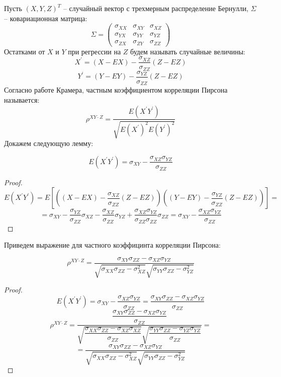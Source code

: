 Пусть $(X,Y,Z)^T$ -- случайный вектор с трехмерным распределение Бернулли,
$\Sigma$ -- ковариационная матрица:
$$\Sigma =
    \begin{pmatrix}
        \sigma_{XX} & \sigma_{XY} & \sigma_{XZ} \\
        \sigma_{YX} & \sigma_{YY} & \sigma_{YZ} \\
        \sigma_{ZX} & \sigma_{ZY} & \sigma_{ZZ}
    \end{pmatrix}
$$
Остатками от $X$ и $Y$ при регрессии на $Z$ будем называть случайные величины:
$$
X^{\prime}=(X-EX)-\dfrac{\sigma_{XZ}}{\sigma_{ZZ}}(Z-EZ)
$$
$$
Y^{\prime}=(Y-EY)-\dfrac{\sigma_{YZ}}{\sigma_{ZZ}}(Z-EZ)
$$
Согласно работе Крамера, частным коэффициентом корреляции Пирсона называется:
$$
\rho^{XY \cdot Z}=\dfrac{E(X^{\prime} Y^{\prime})}{\sqrt{E(X^{\prime})^2 E(Y^{\prime})^2}}
$$
Докажем следующую лемму:
\begin{lemma}
    $$E(X^\prime Y^\prime)=\sigma_{XY}-\dfrac{\sigma_{XZ}\sigma_{YZ}}{\sigma_{ZZ}}$$
\end{lemma}
\begin{proof}
    $$E(X^\prime Y^\prime)=E[((X-EX)-\dfrac{\sigma_{XZ}}{\sigma_{ZZ}}(Z-EZ))((Y-EY)-\dfrac{\sigma_{YZ}}{\sigma_{ZZ}}(Z-EZ))]=$$
    $$=\sigma_{XY}-\dfrac{\sigma_{YZ}}{\sigma_{ZZ}}\sigma_{XZ}-\dfrac{\sigma_{XZ}}{\sigma_{ZZ}}\sigma_{YZ}+
    \dfrac{\sigma_{XZ}\sigma_{YZ}}{\sigma_{ZZ}\sigma_{ZZ}}\sigma_{ZZ}=\sigma_{XY}-\dfrac{\sigma_{XZ} \sigma_{YZ}}{ \sigma_{ZZ}}$$
\end{proof}

Приведем выражение для частного коэффицинта корреляции Пирсона:
\begin{lemma}
    $$
    \rho^{XY \cdot Z}=\dfrac{\sigma_{XY} \sigma_{ZZ} - \sigma_{XZ} \sigma_{YZ}}{\sqrt{\sigma_{XX}\sigma_{ZZ}-
    \sigma_{XZ}^2}\sqrt{\sigma_{YY}\sigma_{ZZ}-\sigma_{YZ}^2}}
    $$
\end{lemma}
\begin{proof}
    $$E(X^\prime Y^\prime)=\sigma_{XY}-\dfrac{\sigma_{XZ}\sigma_{YZ}}{\sigma_{ZZ}}=
    \dfrac{\sigma_{XY}\sigma_{ZZ}-\sigma_{XZ}\sigma_{YZ}}{\sigma_{ZZ}}$$
    $$
    \rho^{XY \cdot Z}=\dfrac{\dfrac{\sigma_{XY}\sigma_{ZZ}-\sigma_{XZ}\sigma_{YZ}}{\sigma_{ZZ}}}
    {\sqrt{
        \dfrac{\sigma_{XX}\sigma_{ZZ}-\sigma_{XZ}\sigma_{XZ}}{\sigma_{ZZ}}
    }\sqrt{
        \dfrac{\sigma_{YY}\sigma_{ZZ}-\sigma_{YZ}\sigma_{YZ}}{\sigma_{ZZ}}
    }}=
    $$
    $$
    =\dfrac{\sigma_{XY} \sigma_{ZZ} - \sigma_{XZ} \sigma_{YZ}}{\sqrt{\sigma_{XX}\sigma_{ZZ}-
    \sigma_{XZ}^2}\sqrt{\sigma_{YY}\sigma_{ZZ}-\sigma_{YZ}^2}}
    $$
\end{proof}

